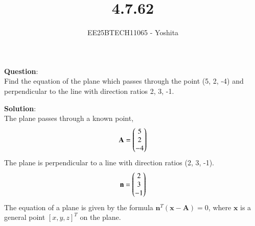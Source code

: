 \documentclass[journal]{IEEEtran}
\begin{document}

\vspace{3cm}

\title{4.7.62}
\author{EE25BTECH11065 - Yoshita}
{\let\newpage\relax\maketitle}

\renewcommand{\thefigure}{\theenumi}
\renewcommand{\thetable}{\theenumi}
\setlength{\intextsep}{10pt} %

\textbf{Question}:\\
Find the equation of the plane which passes through the point (5, 2, -4) and perpendicular to the line with direction ratios 2, 3, -1.\\
\bigskip

\textbf{Solution}:\\
The plane passes through a known point,
\[ \mathbf{A} = \begin{pmatrix}5\\2\\-4\end{pmatrix} \]
The plane is perpendicular to a line with direction ratios (2, 3, -1). 
\[ \mathbf{n} = \begin{pmatrix}2\\3\\-1\end{pmatrix} \]
The equation of a plane is given by the formula $\mathbf{n}^T (\mathbf{x} - \mathbf{A}) = 0$, where $\mathbf{x}$ is a general point $[x, y, z]^T$ on the plane.
\end{document}
